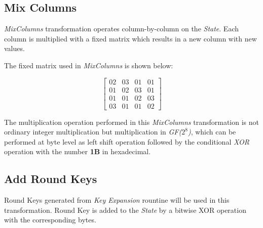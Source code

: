 \documentclass[a4paper, 10pt]{article}
\begin{document}
\begin{multicols}{2}
            \subsection{Mix Columns}
            \label{sec:mixcolumns}

            \textit{MixColumns} transformation operates column-by-column on the \textit{State}. Each column is multiplied with a fixed matrix which results in a new column with new values.

            The fixed matrix used in \textit{MixColumns} is shown below:

            \begin{equation}
            \begin{bmatrix}
                02 & 03 & 01 & 01\\
                01 & 02 & 03 & 01\\
                01 & 01 & 02 & 03\\
                03 & 01 & 01 & 02
            \end{bmatrix}
            \label{equ:mixcolumns-matrix}
        \end{equation}

            The multiplication operation performed in this \textit{MixColumns} transformation is not ordinary integer multiplication but multiplication in \textit{GF($2^{8}$)}, which can be performed at byte level as left shift operation followed by the conditional \textit{XOR} operation with the number \textbf{1B} in hexadecimal.

            \subsection{Add Round Keys}

            Round Keys generated from \textit{Key Expansion} rountine will be used in this transformation. Round Key is added to the \textit{State} by a bitwise XOR operation with the corresponding bytes.
        \end{multicols}
    
\end{document}

